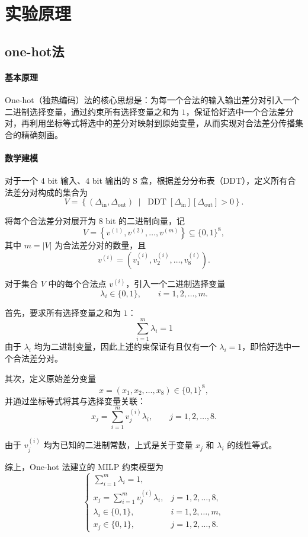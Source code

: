 \section{实验原理}


\subsection{one-hot法}
\paragraph{基本原理}

One-hot（独热编码）法的核心思想是：为每一个合法的输入输出差分对引入一个二进制选择变量，通过约束所有选择变量之和为 $1$，保证恰好选中一个合法差分对，再利用坐标等式将选中的差分对映射到原始变量，从而实现对合法差分传播集合的精确刻画。

\paragraph{数学建模}

对于一个 $4$ bit 输入、$4$ bit 输出的 S 盒，根据差分分布表（DDT），定义所有合法差分对构成的集合为
\[
V=\left\{
(\Delta_{\mathrm{in}},\Delta_{\mathrm{out}})
\;\middle|\;
\operatorname{DDT}[\Delta_{\mathrm{in}}][\Delta_{\mathrm{out}}]>0
\right\}.
\]

将每个合法差分对展开为 $8$ bit 的二进制向量，记
\[
V=\left\{
v^{(1)},v^{(2)},\ldots,v^{(m)}
\right\}
\subseteq \{0,1\}^{8},
\]
其中 $m=|V|$ 为合法差分对的数量，且
\[
v^{(i)}=
\left(v_1^{(i)},v_2^{(i)},\ldots,v_8^{(i)}\right).
\]

对于集合 $V$ 中的每个合法点 $v^{(i)}$，引入一个二进制选择变量
\[
\lambda_i\in\{0,1\},
\qquad i=1,2,\ldots,m.
\]

首先，要求所有选择变量之和为 $1$：
\[
\boxed{
\sum_{i=1}^{m}\lambda_i=1
}
\]
由于 $\lambda_i$ 均为二进制变量，因此上述约束保证有且仅有一个 $\lambda_i=1$，即恰好选中一个合法差分对。

其次，定义原始差分变量
\[
x=(x_1,x_2,\ldots,x_8)\in\{0,1\}^{8},
\]
并通过坐标等式将其与选择变量关联：
\[
\boxed{
x_j=\sum_{i=1}^{m}v_j^{(i)}\lambda_i,
\qquad j=1,2,\ldots,8.
}
\]

由于 $v_j^{(i)}$ 均为已知的二进制常数，上式是关于变量 $x_j$ 和 $\lambda_i$ 的线性等式。

综上，One-hot 法建立的 MILP 约束模型为
\[
\begin{cases}
\displaystyle\sum_{i=1}^{m}\lambda_i=1,\\[6pt]
\displaystyle x_j=\sum_{i=1}^{m}v_j^{(i)}\lambda_i,
& j=1,2,\ldots,8,\\[6pt]
\lambda_i\in\{0,1\},
& i=1,2,\ldots,m,\\[4pt]
x_j\in\{0,1\},
& j=1,2,\ldots,8.
\end{cases}
\]

